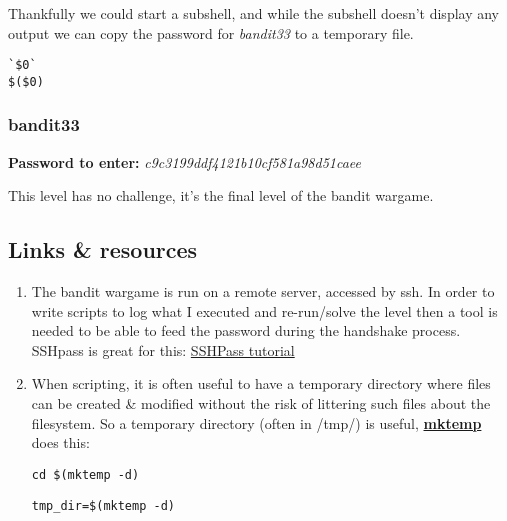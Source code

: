 \documentclass[a4paper]{article}
\newcommand{\pass}[1]{\textbf{Password to enter:} \textit{#1}\\}
\begin{document}
Thankfully we could start a subshell, and while the subshell doesn't display any output we can copy the password for \textit{bandit33} to a temporary file.
\begin{lstlisting}[title=two different ways to launch a subshell with no letters]
`$0`
$($0)
\end{lstlisting}


\subsubsection{bandit33}
\pass{c9c3199ddf4121b10cf581a98d51caee}
\begin{center}
This level has no challenge, it's the final level of the bandit wargame.
\end{center}

\subsection*{Links \& resources}
\begin{enumerate}
\item The bandit wargame is run on a remote server, accessed by ssh. In order to write scripts to log what I executed and re-run/solve the level then a tool is needed to be able to feed the password during the handshake process. SSHpass is great for this: \href{https://askubuntu.com/questions/224181/how-do-i-include-a-password-with-ssh-command-want-to-make-shell-script}{SSHPass tutorial} 

\item When scripting, it is often useful to have a temporary directory where files can be created \& modified without the risk of littering such files about the filesystem. So a temporary directory (often in /tmp/) is useful, \href{https://code-maven.com/create-temporary-directory-on-linux-using-bash}{\textbf{mktemp}} does this:
	\begin{lstlisting}[title=move to the new temporary directory]
	cd $(mktemp -d)
	\end{lstlisting}
	\begin{lstlisting}[title=store the new temporary directory path]
	tmp_dir=$(mktemp -d)
	\end{lstlisting}
\end{enumerate}
\end{document}
